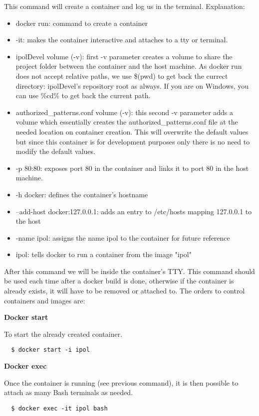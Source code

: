 \documentclass[a4paper,12pt]{article}
\begin{document}
This command will create a container and log us in the terminal. Explanation:
\begin{itemize}
  \item docker run: command to create a container
  \item -it: makes the container interactive and attaches to a tty or terminal.
  \item ipolDevel volume (-v): first -v parameter creates a volume to share the project folder between the container and the host machine.
  As docker run does not accept relative paths, we use \$(pwd) to get back the currect directory: ipolDevel's repository root as always. If you are on
  Windows, you can use \%cd\% to get back the current path. 
  \item authorized\_patterns.conf volume (-v): this second -v parameter adds a volume which essentially creates the authorized\_patterns.conf file at the 
  needed location on container creation. 
  This will overwrite the default values but since this container is for development purposes only there is no need to modify the default values.
  \item -p 80:80: exposes port 80 in the container and links it to port 80 in the host machine.
  \item -h docker: defines the container's hostname
  \item --add-host docker:127.0.0.1: adds an entry to /etc/hosts mapping 127.0.0.1 to the host
  \item -name ipol: assigns the name ipol to the container for future reference
  \item ipol: tells docker to run a container from the image "ipol"
\end{itemize}

After this command we will be inside the container's TTY. This command should be used each time after a docker build is done,
otherwise if the container is already exists, it will have to be removed or attached to. The orders to control containers and images are:

\textbf{Docker start}

To start the already created container.
\begin{verbatim}
  $ docker start -i ipol
\end{verbatim}

\textbf{Docker exec}

Once the container is running (see previous command), it is then possible to attach as many Bash terminals as needed.
\begin{verbatim}
  $ docker exec -it ipol bash
\end{verbatim}
\end{document}
